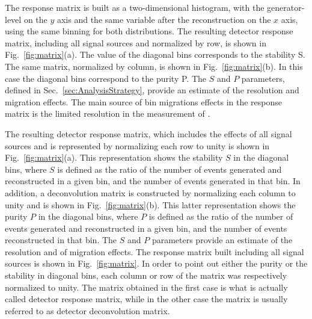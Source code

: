 The response matrix is built as a two-dimensional histogram, with the
generator-level \pth{} on the $y$ axis and the same variable after the reconstruction on the $x$ axis, using the same binning for both distributions.
The resulting detector response matrix, including all signal sources and normalized by row, is shown in Fig.~\ref{fig:matrix}(a).
The value of the diagonal bins corresponds to the stability S. The same matrix, normalized by column, is shown in Fig.~\ref{fig:matrix}(b). In this case the diagonal bins correspond to the purity P. The $S$ and $P$ parameters, defined in Sec.~\ref{sec:AnalysisStrategy}, provide an estimate of the \pth resolution and migration effects.
The main source of bin migrations effects in the response matrix is the limited resolution in the measurement of \MET.

The resulting detector response matrix, which includes the effects of all signal sources and is represented by normalizing each row to unity is shown in Fig.~\ref{fig:matrix}(a). This representation shows the stability $S$ in the diagonal bins, where $S$ is defined as the ratio of the number of events generated and reconstructed in a given bin, and the number of events generated in that bin. In addition, a deconvolution matrix is constructed by normalizing each column to unity and is shown in Fig.~\ref{fig:matrix}(b). This latter representation shows the purity $P$ in the diagonal bins, where $P$ is defined as the ratio of the number of events generated and reconstructed in a given bin, and the number of events reconstructed in that bin. The $S$ and $P$ parameters provide an estimate of the \pth{} resolution and of migration effects.
The response matrix built including all signal sources is shown in Fig.~\ref{fig:matrix}. In order to point out either the purity or the stability in diagonal bins, each column or row of the matrix was respectively normalized to unity. The matrix obtained in the first case is what is actually called detector response matrix, while in the other case the matrix is usually referred to as detector deconvolution matrix.

